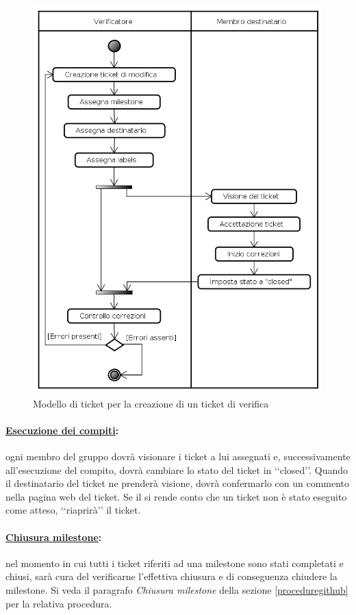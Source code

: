 \begin{figure}[h!]
	\centering
	\includegraphics[scale=0.5]{./content/Immagini/Ticket_Verificato}
	\caption{Modello di ticket per la creazione di un ticket di verifica}
	\label{creazione_ticketver}
\end{figure}

\paragraph{\underline{Esecuzione dei compiti}:} ogni membro del gruppo dovrà visionare i ticket a lui assegnati e, successivamente all'esecuzione del compito, dovrà cambiare lo stato del ticket in \lq\lq{}closed\rq\rq{}. Quando il destinatario del ticket ne prenderà visione, dovrà confermarlo con un commento nella pagina web del ticket. Se il \projectManager{} si rende conto che un ticket non è stato eseguito come atteso, \lq\lq{}riaprirà\rq\rq{} il ticket.

\paragraph{\underline{Chiusura milestone}:} nel momento in cui tutti i ticket riferiti ad una milestone\g{} sono stati completati e chiusi, sarà cura del \projectManager{} verificarne l'effettiva chiusura e di conseguenza chiudere la milestone\g{}. Si veda il paragrafo \textit{Chiusura milestone} della sezione \ref{proceduregithub} per la relativa procedura.

